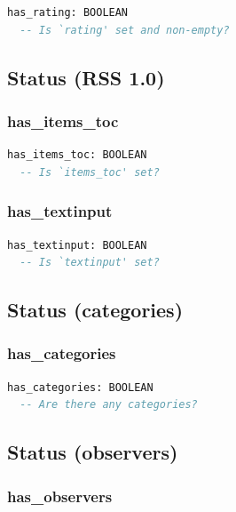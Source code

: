 \begin{lstlisting}[language=Eiffel]
has_rating: BOOLEAN
  -- Is `rating' set and non-empty?
\end{lstlisting}

\subsection{Status (RSS 1.0)}
\label{sec:channel-status-rss10}

\subsubsection{has\_items\_toc}

\begin{lstlisting}[language=Eiffel]
has_items_toc: BOOLEAN
  -- Is `items_toc' set?
\end{lstlisting}

\subsubsection{has\_textinput}

\begin{lstlisting}[language=Eiffel]
has_textinput: BOOLEAN
  -- Is `textinput' set?
\end{lstlisting}

\subsection{Status (categories)}
\label{sec:channel-status-categories}

\subsubsection{has\_categories}

\begin{lstlisting}[language=Eiffel]
has_categories: BOOLEAN
  -- Are there any categories?
\end{lstlisting}

\subsection{Status (observers)}
\label{sec:channel-status-observer}

\subsubsection{has\_observers}

